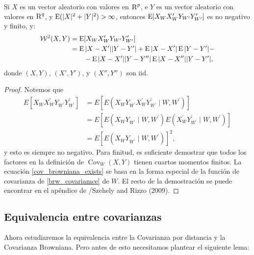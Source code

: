 		\begin{thm}\label{thm_exists_cov_browniana}
			Si $X$ es un vector aleatorio con valores en $\textsc{R}^p$, e $Y$ es un vector aleatorio con valores en $\textsc{R}^q$, y $\operatorname{E}(|X|^2+|Y|^2)>\infty$, entonces $\operatorname{E}[X_{W}X'_{W}Y_{W'}Y'_{W'}]$ es no negativo y finito, y:
			\begin{align}
				\mathcal{W}^2(X,Y) &= \operatorname{E}[X_{W}X'_{W}Y_{W'}Y'_{W'}]\\
								   &= \operatorname{E}|X-X'||Y-Y'| + \operatorname{E}|X-X'|\operatorname{E}|Y-Y'| - \label{cov_browniana_exists} \\ 
								   &\qquad - \operatorname{E}|X-X'||Y-Y''|\operatorname{E}|X-X''||Y-Y'|,\label{eq_37_brcov}
 			\end{align}
			donde $(X,Y)$, $(X',Y')$, y $(X'',Y'')$ son iid.
		\end{thm}
		\begin{proof}
			Notemos que
			$$
			\begin{aligned}
			E\left[X_W X_W^{\prime} Y_{W^{\prime}} Y_{W^{\prime}}^{\prime}\right] & =E\left[E\left(X_W Y_{W^{\prime}} X_W^{\prime} Y_{W^{\prime}}^{\prime} \mid W, W^{\prime}\right)\right] \\
			& =E\left[E\left(X_W Y_{W^{\prime}} \mid W, W^{\prime}\right) E\left(X_W^{\prime} Y_{W^{\prime}}^{\prime} \mid W, W^{\prime}\right)\right] \\
			& =E\left[E\left(X_W Y_{W^{\prime}} \mid W, W^{\prime}\right)\right]^2,
			\end{aligned}
			$$
			y esto es siempre no negativo. Para finitud, es suficiente demostrar que todos los factores en la definici\'on de  $\operatorname{Cov}_W(X, Y)$ tienen cuartos momentos finitos. La ecuaci\'on \ref{cov_browniana_exists} se basa en la forma especial de la funci\'on de covarianza de \ref{brw_covariamce} de $W$. El resto de la demostraci\'on se puede encontrar en el ap\'endice de /Szehely and Rizzo (2009)\cite{Szekely2009}.	
		\end{proof}

	\subsection{Equivalencia entre covarianzas}
	
	Ahora estudiaremos la equivalencia entre la Covarianza por distancia y la Covarianza Browniana. Pero antes de esto necesitamos plantear el siguiente lema:

